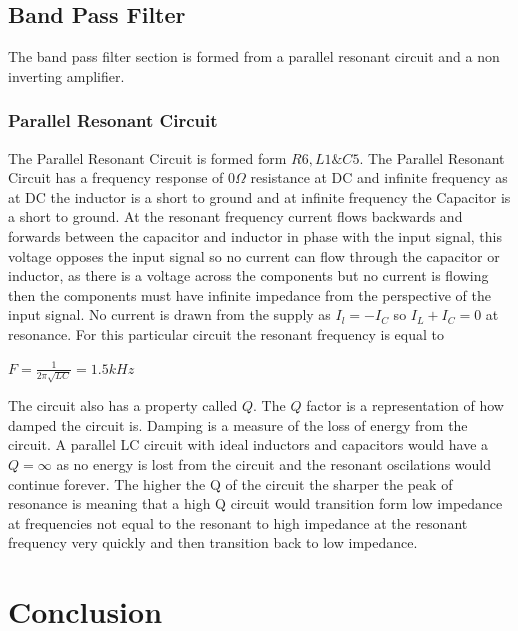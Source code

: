 \documentclass[10pt,a4paper]{article}
\begin{document}
\subsection{Band Pass Filter}   
The band pass filter section is formed from a parallel resonant circuit and a non inverting amplifier.

\subsubsection{Parallel Resonant Circuit}
The Parallel Resonant Circuit is formed form $R6,L1\&C5$. The Parallel Resonant Circuit has a frequency response of $0\Omega$ resistance at DC and infinite frequency as at DC the inductor is a short to ground and at infinite frequency the Capacitor is a short to ground. At the resonant frequency current flows backwards and forwards between the capacitor and inductor in phase with the input signal, this voltage opposes the input signal so no current can flow through the capacitor or inductor, as there is a voltage across the components but no current is flowing then the components must have infinite impedance from the perspective of the input signal. No current is drawn from the supply as $I_l = -I_C$ so $I_L + I_C = 0$ at resonance. For this particular circuit the resonant frequency is equal to

\begin{center}
\Huge

$F=\frac{1}{2\pi\sqrt{LC}} = 1.5kHz$



\end{center}
The circuit also has a property called $Q$. The $Q$ factor is a representation of how damped the circuit is. Damping is a measure of the loss of energy from the circuit. A parallel LC circuit with ideal inductors and capacitors would have a $Q = \infty$ as no energy is lost from the circuit and the resonant oscilations would continue forever. The higher the Q of the circuit the sharper the peak of resonance is meaning that a high Q circuit would transition form low impedance at frequencies not equal to the resonant to high impedance at the resonant frequency very quickly and then transition back to low impedance.       

\section{Conclusion}

\printbibliography
\end{document}
